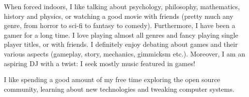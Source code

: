 \documentclass[a4paper,oneside,11pt]{article}
\begin{document}
When forced indoors, I like talking about psychology, philosophy, mathematics, history and physics, or watching a good movie with friends (pretty much any genre, from horror to sci-fi to fantasy to comedy). Furthermore, I have been a gamer for a long time. I love playing almost all genres and fancy playing single player titles, or with friends. I definitely enjoy debating about games and their various aspects (gameplay, story, mechanics, gimmicksm etc.). Moreover, I am an aspiring DJ with a twist: I seek mostly music featured in games!

I like spending a good amount of my free time exploring the open source community, learning about new technologies and tweaking computer systems.
\end{document}
